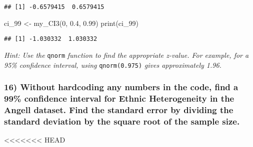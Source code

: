 \documentclass[
  12pt,
]{article}
\newenvironment{Shaded}{\begin{snugshade}}{\end{snugshade}}
\newcommand{\DecValTok}[1]{\textcolor[rgb]{0.00,0.00,0.81}{#1}}
\newcommand{\FloatTok}[1]{\textcolor[rgb]{0.00,0.00,0.81}{#1}}
\newcommand{\FunctionTok}[1]{\textcolor[rgb]{0.00,0.00,0.00}{#1}}
\newcommand{\NormalTok}[1]{#1}
\newcommand{\OtherTok}[1]{\textcolor[rgb]{0.56,0.35,0.01}{#1}}
\newcommand{\SpecialCharTok}[1]{\textcolor[rgb]{0.00,0.00,0.00}{#1}}
\begin{document}
\begin{verbatim}
## [1] -0.6579415  0.6579415
\end{verbatim}

\begin{Shaded}
\begin{Highlighting}[]
\NormalTok{ci\_99 }\OtherTok{\textless{}{-}} \FunctionTok{my\_CI3}\NormalTok{(}\DecValTok{0}\NormalTok{, }\FloatTok{0.4}\NormalTok{, }\FloatTok{0.99}\NormalTok{)}
\FunctionTok{print}\NormalTok{(ci\_99)}
\end{Highlighting}
\end{Shaded}

\begin{verbatim}
## [1] -1.030332  1.030332
\end{verbatim}

\emph{Hint: Use the} \texttt{qnorm} \emph{function to find the
appropriate z-value. For example, for a 95\% confidence interval, using}
\texttt{qnorm(0.975)} \emph{gives approximately 1.96.}

\hypertarget{without-hardcoding-any-numbers-in-the-code-find-a-99-confidence-interval-for-ethnic-heterogeneity-in-the-angell-dataset.-find-the-standard-error-by-dividing-the-standard-deviation-by-the-square-root-of-the-sample-size.}{%
\subsubsection{16) Without hardcoding any numbers in the code, find a
99\% confidence interval for Ethnic Heterogeneity in the Angell dataset.
Find the standard error by dividing the standard deviation by the square
root of the sample
size.}\label{without-hardcoding-any-numbers-in-the-code-find-a-99-confidence-interval-for-ethnic-heterogeneity-in-the-angell-dataset.-find-the-standard-error-by-dividing-the-standard-deviation-by-the-square-root-of-the-sample-size.}}

\textless\textless\textless\textless\textless\textless\textless{} HEAD

\begin{Shaded}
\end{Shaded}
\end{document}
